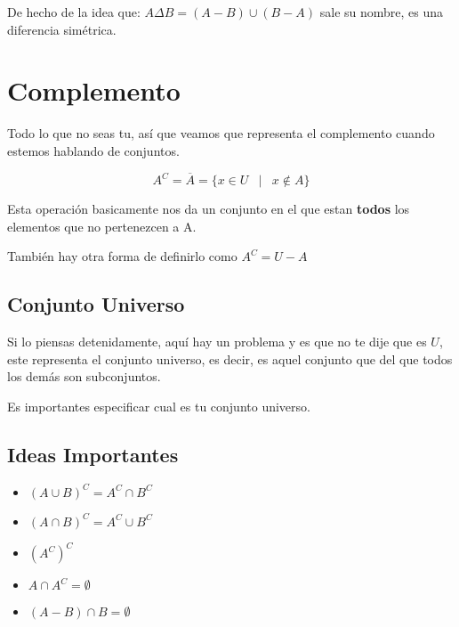 \documentclass[12pt, fleqn]{report}                             %
\DeclareMathOperator \Space {\quad}                             %
\DeclareMathOperator \MiniSpace {\;}                            %
\newcommand \Such {\MiniSpace|\MiniSpace}                       %
\begin{document}
            De hecho de la idea que: $A \Delta B = (A - B) \cup ( B - A)$ sale su nombre, es una diferencia simétrica.




        \clearpage
        \section{Complemento}

            Todo lo que no seas tu, así que veamos que representa el complemento cuando estemos
            hablando de conjuntos.

            \begin{equation}
                A^C = \overline A = \{ x \in U \Such x \notin A \}
            \end{equation}

            Esta operación basicamente nos da un conjunto en el que estan \textbf{todos} los elementos
            que no pertenezcen a A.

            También hay otra forma de definirlo como $A^C = U - A$

            \subsection{Conjunto Universo}
                Si lo piensas detenidamente, aquí hay un problema y es que no te dije que es $U$, este
                representa el conjunto universo, es decir, es aquel conjunto que del que todos los demás
                son subconjuntos.

                Es importantes especificar cual es tu conjunto universo.


            \subsection{Ideas Importantes}

                \begin{itemize}
                    \item $(A \cup B)^C = A^C \cap B^C$

                    \item $(A \cap B)^C = A^C \cup B^C$

                    \item $(A^C)^C$

                    \item $A \cap A^C = \emptyset$

                    \item $(A - B) \cap B = \emptyset$

                \end{itemize}
\end{document}

